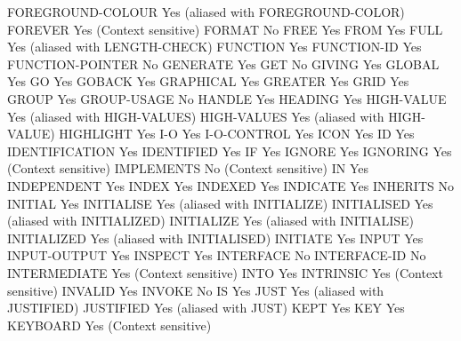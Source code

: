 FOREGROUND-COLOUR               Yes (aliased with FOREGROUND-COLOR)
FOREVER                         Yes (Context sensitive)
FORMAT                          No
FREE                            Yes
FROM                            Yes
FULL                            Yes (aliased with LENGTH-CHECK)
FUNCTION                        Yes
FUNCTION-ID                     Yes
FUNCTION-POINTER                No
GENERATE                        Yes
GET                             No
GIVING                          Yes
GLOBAL                          Yes
GO                              Yes
GOBACK                          Yes
GRAPHICAL                       Yes
GREATER                         Yes
GRID                            Yes
GROUP                           Yes
GROUP-USAGE                     No
HANDLE                          Yes
HEADING                         Yes
HIGH-VALUE                      Yes (aliased with HIGH-VALUES)
HIGH-VALUES                     Yes (aliased with HIGH-VALUE)
HIGHLIGHT                       Yes
I-O                             Yes
I-O-CONTROL                     Yes
ICON                            Yes
ID                              Yes
IDENTIFICATION                  Yes
IDENTIFIED                      Yes
IF                              Yes
IGNORE                          Yes
IGNORING                        Yes (Context sensitive)
IMPLEMENTS                      No (Context sensitive)
IN                              Yes
INDEPENDENT                     Yes
INDEX                           Yes
INDEXED                         Yes
INDICATE                        Yes
INHERITS                        No
INITIAL                         Yes
INITIALISE                      Yes (aliased with INITIALIZE)
INITIALISED                     Yes (aliased with INITIALIZED)
INITIALIZE                      Yes (aliased with INITIALISE)
INITIALIZED                     Yes (aliased with INITIALISED)
INITIATE                        Yes
INPUT                           Yes
INPUT-OUTPUT                    Yes
INSPECT                         Yes
INTERFACE                       No
INTERFACE-ID                    No
INTERMEDIATE                    Yes (Context sensitive)
INTO                            Yes
INTRINSIC                       Yes (Context sensitive)
INVALID                         Yes
INVOKE                          No
IS                              Yes
JUST                            Yes (aliased with JUSTIFIED)
JUSTIFIED                       Yes (aliased with JUST)
KEPT                            Yes
KEY                             Yes
KEYBOARD                        Yes (Context sensitive)
